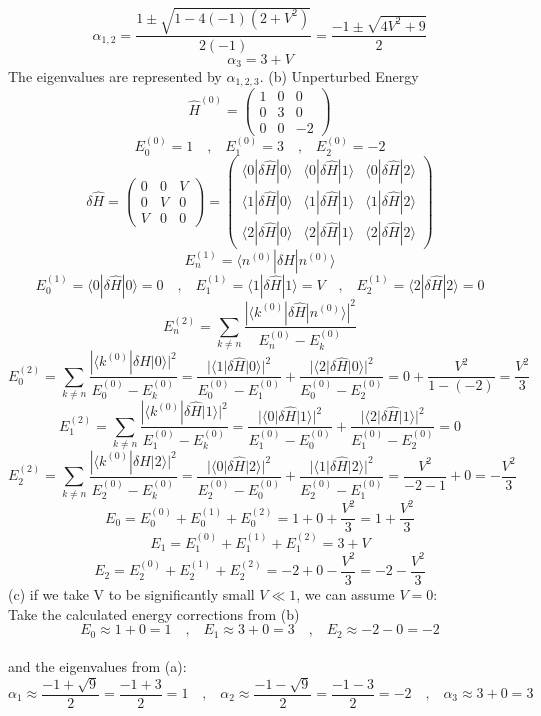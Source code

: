 \documentclass[11pt]{article}
\def\and{\quad \text{and} \quad}
\def\la{\langle}
\def\ra{\rangle}
\def\sp{\vspace{3mm}}
\newcommand{\Matrix}[1]{\begin{pmatrix} #1 \end{pmatrix}}
\renewcommand{\hat}{\widehat}
\theoremstyle{pink}
\theoremstyle{boxedsolution}
\theoremstyle{definition}
\theoremstyle{claim}
\begin{document}
\[\alpha_{1,2}=\frac{1\pm\sqrt{1-4(-1)(2+V^2)}}{2(-1)}=\frac{-1\pm\sqrt{4V^2+9}}{2}\]
\sp
\[\alpha_3=3+V\]
The eigenvalues are represented by $\alpha_{1,2,3}$.
\newpage
(b)
Unperturbed Energy
\sp
\[\hat{H}^{(0)}=\Matrix{1 & 0 & 0\\ 0 & 3 & 0\\ 0 & 0 & -2}\]
\sp
\[E^{(0)}_0=1 \text{ } \text{ , } \text{ } E^{(0)}_1=3  \text{ } \text{ , } \text{ } E^{(0)}_2=-2\]
\sp %
\[\delta\hat{H}=\Matrix{0 & 0& V\\ 0 & V & 0\\ V & 0 & 0}=\Matrix{\la0|\delta\hat{H}|0\ra & \la0|\delta\hat{H}|1\ra & \la0|\delta\hat{H}|2\ra \\ \la1|\delta\hat{H}|0\ra & \la1|\delta\hat{H}|1\ra & \la1|\delta\hat{H}|2\ra\\
\la2|\delta\hat{H}|0\ra & \la2|\delta\hat{H}|1\ra & \la2|\delta\hat{H}|2\ra }\]
\sp
\[E_n^{(1)}= \la n^{(0)}|\delta \hat{H}|n^{(0)}\ra\]
\sp
\[E_0^{(1)}= \la 0|\delta\hat{H}|0 \ra= 0 \text{ } \text{ , } \text{ } E_1^{(1)}= \la 1|\delta\hat{H}|1 \ra= V \text{ } \text{ , } \text{ } E_2^{(1)}= \la 2|\delta\hat{H}|2 \ra= 0\]
\sp
\[E_n^{(2)}= \sum_{k\neq n}\frac{|\la k^{(0)}|\delta \hat{H}|n^{(0)}\ra|^2}{E_n^{(0)}-E_k^{(0)}}\]
\sp
\[E_0^{(2)}=\sum_{k\neq n}\frac{|\la k^{(0)}|\delta \hat{H}|0\ra|^2}{E_0^{(0)}-E_k^{(0)}}=\frac{|\la 1|\delta \hat{H}|0\ra|^2}{E_0^{(0)}-E_1^{(0)}}+\frac{|\la 2|\delta \hat{H}|0\ra|^2}{E_0^{(0)}-E_2^{(0)}}=0+\frac{V^2}{1-(-2)}=\frac{V^2}{3}\]
\sp
\[E_1^{(2)}=\sum_{k\neq n}\frac{|\la k^{(0)}|\delta \hat{H}|1\ra|^2}{E_1^{(0)}-E_k^{(0)}}=
\frac{|\la 0|\delta \hat{H}|1\ra|^2}{E_1^{(0)}-E_0^{(0)}}+
\frac{|\la 2|\delta \hat{H}|1\ra|^2}{E_1^{(0)}-E_2^{(0)}}
=0\]
\sp
\[E_2^{(2)}=\sum_{k\neq n}\frac{|\la k^{(0)}|\delta \hat{H}|2\ra|^2}{E_2^{(0)}-E_k^{(0)}}=
\frac{|\la 0|\delta \hat{H}|2\ra|^2}{E_2^{(0)}-E_0^{(0)}}+
\frac{|\la 1|\delta \hat{H}|2\ra|^2}{E_2^{(0)}-E_1^{(0)}}
=\frac{V^2}{-2-1}+0=-\frac{V^2}{3}\]
\sp
\[E_0=E_0^{(0)}+E_0^{(1)}+E_0^{(2)}=1+0+\frac{V^2}{3}=1+\frac{V^2}{3}\]
\sp
\[E_1=E_1^{(0)}+E_1^{(1)}+E_1^{(2)}=3+V\]
\sp
\[E_2=E_2^{(0)}+E_2^{(1)}+E_2^{(2)}=-2+0-\frac{V^2}{3}=-2-\frac{V^2}{3}\]
\newpage
(c) if we take V to be significantly small $V\ll 1$, we can assume $V=0$:
\sp
\\Take the calculated energy corrections from (b)
\[E_0\approx 1+0=1 \text{ } \text{ , } \text{ } E_1\approx3+0=3 \text{ } \text{ , } \text{ } E_2 \approx -2 - 0 = -2\]
\sp
\\and the eigenvalues from (a):
\[\alpha_1\approx\frac{-1+\sqrt{9}}{2}=\frac{-1+3}{2}=1 \text{ } \text{ , } \text{ } \alpha_2\approx\frac{-1-\sqrt{9}}{2}=\frac{-1-3}{2}=-2 \text{ } \text{ , } \text{ }
\alpha_3 \approx 3+0 = 3\]
\end{document}
